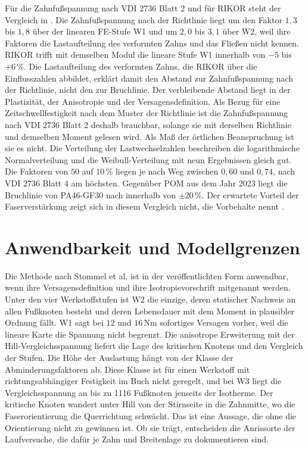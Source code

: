 Für die Zahnfußspannung nach VDI 2736 Blatt 2 und für RIKOR steht der Vergleich in . Die Zahnfußspannung nach der Richtlinie liegt um den Faktor $1{,}3$ bis $1{,}8$ über der linearen FE-Stufe W1 und um $2{,}0$ bis $3{,}1$ über W2, weil ihre Faktoren die Lastaufteilung des verformten Zahns und das Fließen nicht kennen. RIKOR trifft mit demselben Modul die lineare Stufe W1 innerhalb von $-5$ bis $+6$\,\%. Die Lastaufteilung des verformten Zahns, die RIKOR über die Einflusszahlen abbildet, erklärt damit den Abstand zur Zahnfußspannung nach der Richtlinie, nicht den zur Bruchlinie. Der verbleibende Abstand liegt in der Plastizität, der Anisotropie und der Versagensdefinition. Als Bezug für eine Zeitschwellfestigkeit nach dem Muster der Richtlinie ist die Zahnfußspannung nach VDI 2736 Blatt 2 deshalb brauchbar, solange sie mit derselben Richtlinie und demselben Moment gelesen wird. Als Maß der örtlichen Beanspruchung ist sie es nicht. Die Verteilung der Lastwechselzahlen beschreiben die logarithmische Normalverteilung und die Weibull-Verteilung mit neun Ergebnissen gleich gut. Die Faktoren von $50$ auf $10$\,\% liegen je nach Weg zwischen $0{,}60$ und $0{,}74$, nach VDI 2736 Blatt 4 am höchsten. Gegenüber POM aus dem Jahr 2023 liegt die Bruchlinie von PA46-GF30 nach  innerhalb von $\pm 20$\,\%. Der erwartete Vorteil der Faserverstärkung zeigt sich in diesem Vergleich nicht, die Vorbehalte nennt .

\section{Anwendbarkeit und Modellgrenzen}
\label{sec:modellgrenzen}

Die Methode nach Stommel et al. ist in der veröffentlichten Form anwendbar, wenn ihre Versagensdefinition und ihre Isotropievorschrift mitgenannt werden. Unter den vier Werkstoffstufen ist W2 die einzige, deren statischer Nachweis an allen Fußknoten besteht und deren Lebensdauer mit dem Moment in plausibler Ordnung fällt. W1 sagt bei $12$ und $16$\,Nm sofortiges Versagen vorher, weil die lineare Karte die Spannung nicht begrenzt. Die anisotrope Erweiterung mit der Hill-Vergleichs\-spannung liefert die Lage des kritischen Knotens und den Vergleich der Stufen. Die Höhe der Auslastung hängt von der Klasse der Abminderungsfaktoren ab. Diese Klasse ist für einen Werkstoff mit richtungsabhängiger Festigkeit im Buch nicht geregelt, und bei W3 liegt die Vergleichsspannung an bis zu 1116 Fußknoten jenseits der Isotherme. Der kritische Knoten wandert unter Hill von der Stirnseite in die Zahnmitte, wo die Faserorientierung die Querrichtung schwächt. Das ist eine Aussage, die ohne die Orientierung nicht zu gewinnen ist. Ob sie trägt, entscheiden die Anrissorte der Laufversuche, die dafür je Zahn und Breitenlage zu dokumentieren sind.


